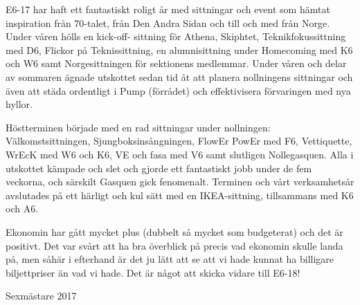 \documentclass[../_main/handlingar.tex]{subfiles}
\begin{document}
E6-17 har haft ett fantastiskt roligt år med sittningar och event som hämtat inspiration från 70-talet,
från Den Andra Sidan och till och med från Norge. Under våren hölls en kick-off- sittning för Athena,
Skiphtet, Teknikfokussittning med D6, Flickor på Teknissittning, en alumnisittning under Homecoming
med K6 och W6 samt Norgesittningen för sektionens medlemmar. Under våren och delar av sommaren
ägnade utskottet sedan tid åt att planera nollningens sittningar och även att städa ordentligt i Pump
(förrådet) och effektivisera förvaringen med nya hyllor.

Höstterminen började med en rad sittningar under nollningen: Välkomstsittningen,
Sjungboksinsångningen, FlowEr PowEr med F6, Vettiquette, WrEcK med W6 och K6, VE och fasa med V6
samt slutligen Nollegasquen. Alla i utskottet kämpade och slet och gjorde ett fantastiskt jobb under de
fem veckorna, och särskilt Gasquen gick fenomenalt. Terminen och vårt verksamhetsår avslutades på ett
härligt och kul sätt med en IKEA-sittning, tillsammans med K6 och A6.

Ekonomin har gått mycket plus (dubbelt så mycket som budgeterat) och det är positivt. Det var svårt att
ha bra överblick på precis vad ekonomin skulle landa på, men såhär i efterhand är det ju lätt att se att vi
hade kunnat ha billigare biljettpriser än vad vi hade. Det är något att skicka vidare till E6-18!
\begin{signatures}{1}
    \mvh
    \signature{Linnea Sjödahl}{Sexmästare 2017}
\end{signatures}
\end{document}
